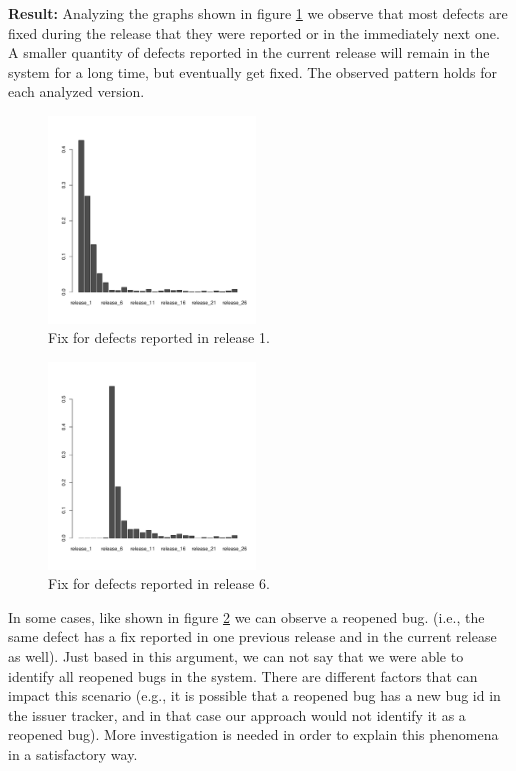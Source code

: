 \vspace{1mm}
\noindent\textbf{Result:} Analyzing the graphs shown in figure \ref{fig:defect_release_1} we observe that most defects are fixed during the release that they were reported or in the immediately next one. A smaller quantity of defects reported in the current release will remain in the system for a long time, but eventually get fixed. The observed pattern holds for each analyzed version. 

\begin{figure}[thb!]
	\caption{Fix for defects reported in release 1.}
	\label{fig:defect_release_1}
	\includegraphics[width=0.49\textwidth]{figures/r1}
\end{figure}

\begin{figure}[thb!]
	\caption{Fix for defects reported in release 6.}
	\label{fig:defect_release_6}
	\includegraphics[width=0.49\textwidth]{figures/r6}
\end{figure}

In some cases, like shown in figure \ref{fig:defect_release_6} we can observe a reopened bug. (i.e., the same defect has a fix reported in one previous release and in the current release as well). Just based in this argument, we can not say that we were able to identify all reopened bugs in the system. There are different factors that can impact this scenario (e.g., it is possible that a reopened bug has a new bug id in the issuer tracker, and in that case our approach would not identify it as a reopened bug).  More investigation is needed in order to explain this phenomena in a satisfactory way. 

